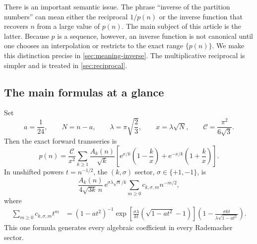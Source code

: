 \documentclass[11pt,a4paper]{article}
\numberwithin{equation}{section}
\theoremstyle{remark}
\newcommand{\e}{\mathrm e}
\newcommand{\Ccal}{\mathcal C}
\begin{document}
There is an important semantic issue.  The phrase ``inverse of the partition numbers'' can mean either the reciprocal $1/p(n)$ or the inverse function that recovers $n$ from a large value of $p(n)$.  The main subject of this article is the latter.  Because $p$ is a sequence, however, an inverse function is not canonical until one chooses an interpolation or restricts to the exact range $\{p(n)\}$.  We make this distinction precise in \cref{sec:meaning-inverse}.  The multiplicative reciprocal is simpler and is treated in \cref{sec:reciprocal}.

\subsection{The main formulas at a glance}

Set
\begin{equation}\label{eq:master-variables}
 a=\frac1{24},\qquad N=n-a,\qquad
 \lambda=\pi\sqrt{\frac23},\qquad x=\lambda\sqrt N,
 \qquad \Ccal=\frac{\pi^2}{6\sqrt3}.
\end{equation}
Then the exact forward transseries is
\begin{equation}\label{eq:intro-exact}
 p(n)=\frac{\Ccal}{x^2}\sum_{k\ge1}\frac{A_k(n)}{\sqrt{k}}
 \left[\e^{x/k}\left(1-\frac{k}{x}\right)
       +\e^{-x/k}\left(1+\frac{k}{x}\right)\right].
\end{equation}
In unshifted powers $t=n^{-1/2}$, the $(k,\sigma)$ sector, $\sigma\in\{+1,-1\}$, is
\begin{equation}\label{eq:intro-sector}
 \frac{A_k(n)}{4\sqrt{3k}\,n}\,
 \e^{\sigma\lambda\sqrt n/k}
 \sum_{m\ge0}c_{k,\sigma,m}n^{-m/2},
\end{equation}
where
\begin{align}
 \sum_{m\ge0}c_{k,\sigma,m}t^m
 &=(1-at^2)^{-1}
 \exp\!\left[\frac{\sigma\lambda}{kt}
       \left(\sqrt{1-at^2}-1\right)\right]
 \left(1-\frac{\sigma kt}{\lambda\sqrt{1-at^2}}\right).
 \label{eq:intro-coeff-gf}
\end{align}
This one formula generates every algebraic coefficient in every Rademacher sector.
\end{document}
